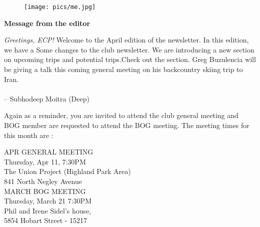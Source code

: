 \documentclass[10pt,a4paper]{article}
\newcommand{\NewsItem}[1]{%
		\usefont{T1}{augie}{m}{n} 	
		\large \bf #1 \vspace{4pt}
		\par \normalsize \normalfont}
\begin{document}
\begin{center}
\begin{minipage}[h]{0.8\linewidth}
	\begin{wrapfigure}{l}{0.41\textwidth}
		\texttt{[image: pics/me.jpg]}
		\\%
	\end{wrapfigure}
	
	\NewsItem{Message from the editor}
	\emph{Greetings, ECP!} Welcome to the April edition of the newsletter. In this edition, we have a 
	Some changes to the club newsletter. We are introducing a new section on upcoming trips and potential trips.Check out the section.  Greg Buzulencia will be giving a talk this coming general meeting on his backcountry skiing trip to  Iran. 
\\
\\
-- Subhodeep Moitra (Deep)

\vspace{0.5cm}

	Again as a reminder, you are invited to attend the club general meeting and BOG member are requested to attend the BOG meeting. The meeting times for this month are :
	
\vspace{1cm}

\begin{multicols}{2}
\Large
APR GENERAL MEETING\\
Thursday, Apr 11, 7:30PM\\
The Union Project (Highland Park Area)\\
841 North Negley Avenue
\\

MARCH BOG MEETING\\
Thursday, March 21 7:30PM\\
Phil and Irene  Sidel's house,\\
5854 Hobart Street - 15217

\normalsize
\end{multicols}
	
\end{minipage}
\end{center}

\pagebreak
\clearpage
\end{document}
